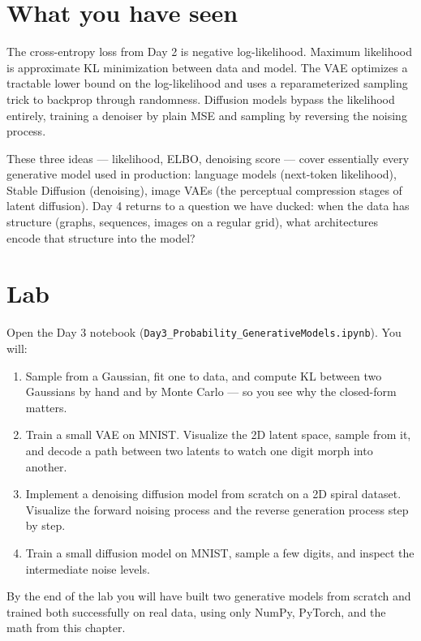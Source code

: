 \section{What you have seen}

The cross-entropy loss from Day 2 is negative log-likelihood. Maximum likelihood is approximate KL minimization between data and model. The VAE optimizes a tractable lower bound on the log-likelihood and uses a reparameterized sampling trick to backprop through randomness. Diffusion models bypass the likelihood entirely, training a denoiser by plain MSE and sampling by reversing the noising process.

These three ideas --- likelihood, ELBO, denoising score --- cover essentially every generative model used in production: language models (next-token likelihood), Stable Diffusion (denoising), image VAEs (the perceptual compression stages of latent diffusion). Day 4 returns to a question we have ducked: when the data has structure (graphs, sequences, images on a regular grid), what architectures encode that structure into the model?

\section*{Lab}

Open the Day 3 notebook (\texttt{Day3\_Probability\_GenerativeModels.ipynb}). You will:

\begin{enumerate}
  \item Sample from a Gaussian, fit one to data, and compute KL between two Gaussians by hand and by Monte Carlo --- so you see why the closed-form matters.
  \item Train a small VAE on MNIST. Visualize the 2D latent space, sample from it, and decode a path between two latents to watch one digit morph into another.
  \item Implement a denoising diffusion model from scratch on a 2D spiral dataset. Visualize the forward noising process and the reverse generation process step by step.
  \item Train a small diffusion model on MNIST, sample a few digits, and inspect the intermediate noise levels.
\end{enumerate}

By the end of the lab you will have built two generative models from scratch and trained both successfully on real data, using only NumPy, PyTorch, and the math from this chapter.
